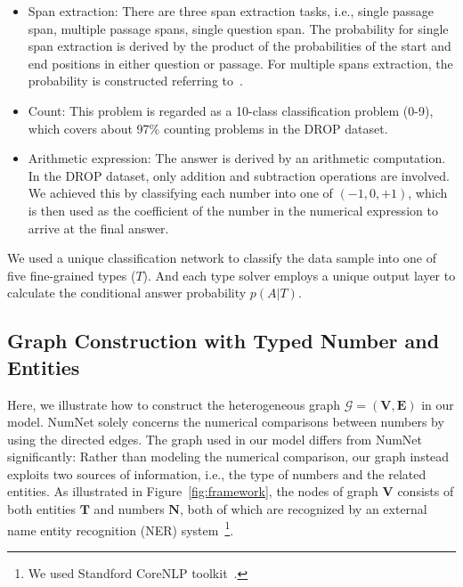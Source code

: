 \documentclass{article}
\begin{document}
\begin{itemize}\item Span extraction: There are three span extraction tasks, i.e., single passage span, multiple passage spans, single question span. The probability for single span extraction is derived by the product of the probabilities of the start and end positions in either question or passage. For multiple spans extraction, the probability is constructed referring to~\cite{DBLP:journals/corr/abs-1909-13375}.
\item Count: This problem is regarded as a 10-class classification problem (0-9), which covers about 97\% counting problems in the DROP dataset.
\item Arithmetic expression: The answer is derived by an arithmetic computation. In the DROP dataset, only addition and subtraction operations are involved. We achieved this by classifying each number into one of $(-1, 0, +1)$, which is then used as the coefficient of the number in the numerical expression to arrive at the final answer.
\end{itemize}
We used a unique classification network to classify the data sample into one of five fine-grained types ($T$).
And each type solver employs a unique output layer to calculate the conditional answer probability $p({A}|{T})$.



\subsection{Graph Construction with Typed Number and Entities}
\label{sec:graph}


Here, we illustrate how to construct the heterogeneous graph $\mathcal{G}=(\mathbf{V}, \mathbf{E})$ in our model.
NumNet solely concerns the numerical comparisons between numbers by using the directed edges.
The graph used in our model differs from NumNet significantly: Rather than modeling the numerical comparison, our graph instead exploits two sources of information, i.e., the type of numbers and the related entities.
As illustrated in Figure~\ref{fig:framework}, the nodes of graph $\mathbf{V}$ consists of both entities $\mathbf{T}$ and numbers $\mathbf{N}$, both of which are recognized by an external name entity recognition (NER) system~\footnote{We used Standford CoreNLP toolkit~\cite{DBLP:conf/acl/ManningSBFBM14}.}.
\end{document}
